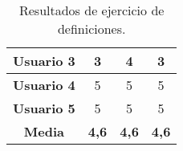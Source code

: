 \begin{table}[H]
{\begin{tabular}{l|ccc|}
            \multicolumn{1}{|l|}{\textbf{Usuario 3}} & \multicolumn{1}{c|}{3}                                                                                                                                          & \multicolumn{1}{c|}{4}                                                                                                                                                                 & 3                                                                                                                                                                                                        \\ \hline
            \multicolumn{1}{|l|}{\textbf{Usuario 4}} & \multicolumn{1}{c|}{5}                                                                                                                                          & \multicolumn{1}{c|}{5}                                                                                                                                                                 & 5                                                                                                                                                                                                        \\ \hline
            \multicolumn{1}{|l|}{\textbf{Usuario 5}} & \multicolumn{1}{c|}{5}                                                                                                                                          & \multicolumn{1}{c|}{5}                                                                                                                                                                 & 5                                                                                                                                                                                                        \\ \hline
            \multicolumn{1}{|c|}{\textbf{Media}}     & \multicolumn{1}{c|}{\textbf{4,6}}                                                                                                                               & \multicolumn{1}{c|}{\textbf{4,6}}                                                                                                                                                      & \textbf{4,6}                                                                                                                                                                                             \\ \hline
        \end{tabular}%
    }
    \caption{Resultados de ejercicio de definiciones.}
    \label{tab:resultadosDefiniciones}
\end{table}

